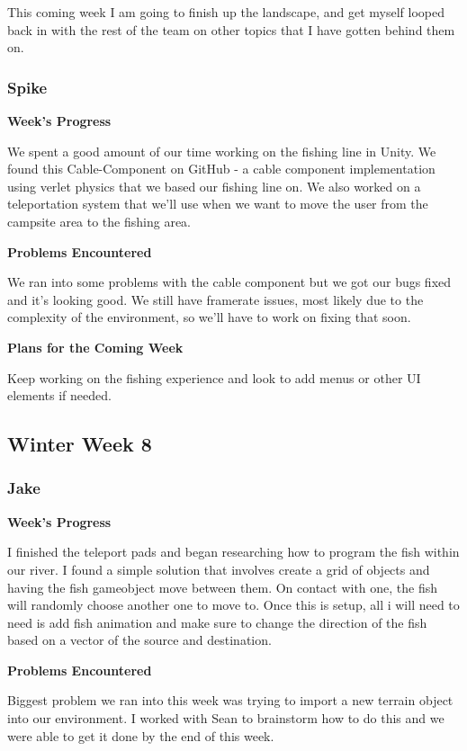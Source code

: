 \documentclass[10pt,journal,compsoc,onecolumn, draftclsnofoot]{IEEEtran}
\begin{document}
This coming week I am going to finish up the landscape, and get myself looped back in with the rest of the team on other topics that I have gotten behind them on.

\subsubsection{Spike}
\noindent \textbf{Week's Progress}

We spent a good amount of our time working on the fishing line in Unity. We found this Cable-Component on GitHub - a cable component implementation using verlet physics that we based our fishing line on. We also worked on a teleportation system that we'll use when we want to move the user from the campsite area to the fishing area.

\noindent \textbf{Problems Encountered}

We ran into some problems with the cable component but we got our bugs fixed and it's looking good. We still have framerate issues, most likely due to the complexity of the environment, so we'll have to work on fixing that soon.

\noindent \textbf{Plans for the Coming Week}

Keep working on the fishing experience and look to add menus or other UI elements if needed.

\subsection{Winter Week 8}
\subsubsection{Jake}
\noindent \textbf{Week's Progress}

I finished the teleport pads and began researching how to program the fish within our river. I found a simple solution that involves create a grid of objects and having the fish gameobject move between them. On contact with one, the fish will randomly choose another one to move to. Once this is setup, all i will need to need is add fish animation and make sure to change the direction of the fish based on a vector of the source and destination.

\noindent \textbf{Problems Encountered}

Biggest problem we ran into this week was trying to import a new terrain object into our environment. I worked with Sean to brainstorm how to do this and we were able to get it done by the end of this week.
\end{document}
